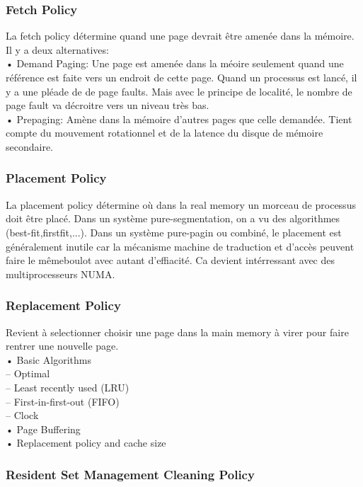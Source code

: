 \subsubsection{Fetch Policy}
La fetch policy détermine quand une page devrait être amenée dans la mémoire. Il y a deux alternatives:\\
• Demand Paging: Une page est amenée dans la méoire seulement quand une référence est faite vers un endroit de cette page. Quand un processus est lancé, il y a une pléade de de page faults. Mais avec le principe de localité, le nombre de page fault va décroitre vers un niveau très bas.\\
• Prepaging: Amène dans la mémoire d'autres pages que celle demandée. Tient compte du mouvement rotationnel et de la latence du disque de mémoire secondaire.\\
\subsubsection{Placement Policy}
La placement policy détermine où dans la real memory un morceau de processus doit être placé. Dans un système pure-segmentation, on a vu des algorithmes (best-fit,firstfit,...). Dans un système pure-pagin ou combiné, le placement est généralement inutile car la mécanisme machine de traduction et d'accès peuvent faire le mêmeboulot avec autant d'effiacité. Ca devient intérressant avec des multiprocesseurs NUMA.
\subsubsection{Replacement Policy}
Revient à selectionner choisir une page dans la main memory à virer pour faire rentrer une nouvelle page.\\
• Basic Algorithms\\
– Optimal\\
– Least recently used (LRU)\\
– First-in-first-out (FIFO) \\
– Clock\\
• Page Buffering\\
• Replacement policy and cache size
\subsubsection{Resident Set Management Cleaning Policy}
